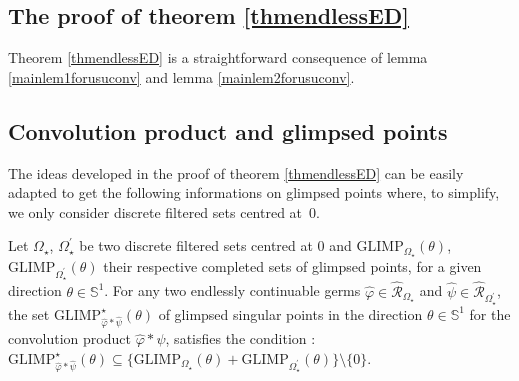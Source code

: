 \documentclass[11pt, english]{smfart}
\theoremstyle{definition}
\begin{document}
\subsection{The proof of theorem \ref{thmendlessED}}

Theorem \ref{thmendlessED} is a straightforward consequence  of lemma
\ref{mainlem1forusuconv} and lemma
\ref{mainlem2forusuconv}.

\subsection{Convolution product and  glimpsed  points}\label{submainthmcor}

The ideas developed in the proof of theorem \ref{thmendlessED}  can be easily adapted
to get the following informations on glimpsed points where, to
simplify, we only consider discrete filtered sets centred at~$0$.

\begin{prop}\label{mainthmglimpsed}
Let $\Omega_\star$, $\Omega_\star^\prime$ be two  discrete
filtered sets centred at $0$ and
$\mathrm{GLIMP}_{\Omega_\star}(\theta)$,
$\mathrm{GLIMP}_{\Omega_\star^\prime}(\theta)$ their
    respective completed sets of glimpsed points, for a given direction $\theta
    \in \mathbb{S}^1$. For any two endlessly continuable germs 
 $\widehat{\varphi} \in \widehat{\mathscr{R}}_{\Omega_\star}$ and $\widehat{\psi} \in
\widehat{\mathscr{R}}_{\Omega_\star^\prime}$, the set 
$\mathrm{GLIMP}_{\widehat{\varphi}\ast \widehat{\psi}}^\star(\theta)$
of  glimpsed singular points in the direction  $\theta \in \mathbb{S}^1$ for the
convolution product   $\widehat{\varphi}  \ast \widehat{\psi}$,
satisfies the condition : $\mathrm{GLIMP}_{\widehat{\varphi}\ast
  \widehat{\psi}}^\star(\theta) \subseteq
\{\mathrm{GLIMP}_{\Omega_\star}(\theta)+\mathrm{GLIMP}_{\Omega_\star^\prime}(\theta)\}
\setminus \{0\}$.
\end{prop}
\end{document}
